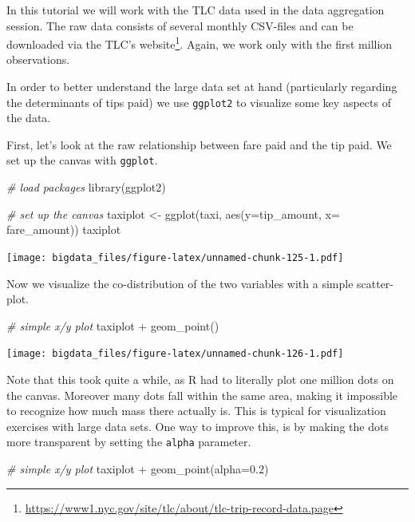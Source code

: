 \documentclass[
  12pt,
]{style/krantz}
\newenvironment{Shaded}{\begin{snugshade}}{\end{snugshade}}
\newcommand{\AttributeTok}[1]{\textcolor[rgb]{0.77,0.63,0.00}{#1}}
\newcommand{\CommentTok}[1]{\textcolor[rgb]{0.56,0.35,0.01}{\textit{#1}}}
\newcommand{\FloatTok}[1]{\textcolor[rgb]{0.00,0.00,0.81}{#1}}
\newcommand{\FunctionTok}[1]{\textcolor[rgb]{0.00,0.00,0.00}{#1}}
\newcommand{\NormalTok}[1]{#1}
\newcommand{\OtherTok}[1]{\textcolor[rgb]{0.56,0.35,0.01}{#1}}
\newcommand{\SpecialCharTok}[1]{\textcolor[rgb]{0.00,0.00,0.00}{#1}}
\renewcommand{\href}[2]{#2\footnote{\url{#1}}}
\begin{document}
In this tutorial we will work with the TLC data used in the data aggregation session. The raw data consists of several monthly CSV-files and can be downloaded via the \href{https://www1.nyc.gov/site/tlc/about/tlc-trip-record-data.page}{TLC's website}. Again, we work only with the first million observations.

In order to better understand the large data set at hand (particularly regarding the determinants of tips paid) we use \texttt{ggplot2} to visualize some key aspects of the data.

First, let's look at the raw relationship between fare paid and the tip paid. We set up the canvas with \texttt{ggplot}.

\begin{Shaded}
\begin{Highlighting}[]
\CommentTok{\# load packages}
\FunctionTok{library}\NormalTok{(ggplot2)}

\CommentTok{\# set up the canvas}
\NormalTok{taxiplot }\OtherTok{\textless{}{-}} \FunctionTok{ggplot}\NormalTok{(taxi, }\FunctionTok{aes}\NormalTok{(}\AttributeTok{y=}\NormalTok{tip\_amount, }\AttributeTok{x=}\NormalTok{ fare\_amount)) }
\NormalTok{taxiplot}
\end{Highlighting}
\end{Shaded}

\texttt{[image: bigdata\_files/figure-latex/unnamed-chunk-125-1.pdf]}

Now we visualize the co-distribution of the two variables with a simple scatter-plot.

\begin{Shaded}
\begin{Highlighting}[]
\CommentTok{\# simple x/y plot}
\NormalTok{taxiplot }\SpecialCharTok{+}
     \FunctionTok{geom\_point}\NormalTok{()}
\end{Highlighting}
\end{Shaded}

\texttt{[image: bigdata\_files/figure-latex/unnamed-chunk-126-1.pdf]}

Note that this took quite a while, as R had to literally plot one million dots on the canvas. Moreover many dots fall within the same area, making it impossible to recognize how much mass there actually is. This is typical for visualization exercises with large data sets. One way to improve this, is by making the dots more transparent by setting the \texttt{alpha} parameter.

\begin{Shaded}
\begin{Highlighting}[]
\CommentTok{\# simple x/y plot}
\NormalTok{taxiplot }\SpecialCharTok{+}
     \FunctionTok{geom\_point}\NormalTok{(}\AttributeTok{alpha=}\FloatTok{0.2}\NormalTok{)}
\end{Highlighting}
\end{Shaded}
\end{document}
